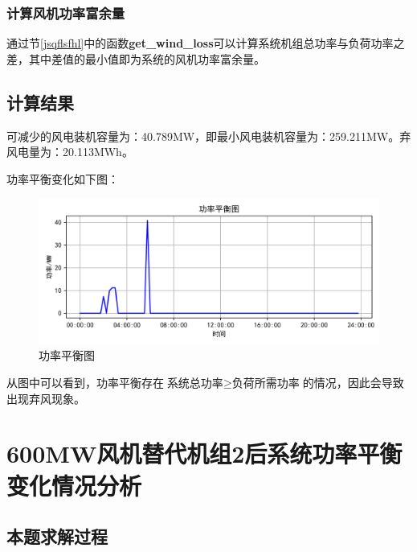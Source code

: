 \documentclass{cumcmthesis}
\begin{document}
	
	
	\subsubsection{计算风机功率富余量}
	通过节\ref{jsqflsfhl}中的函数\textbf{get\_wind\_loss}可以计算系统机组总功率与负荷功率之差，其中差值的最小值即为系统的风机功率富余量。
	
	
	\subsection{计算结果}
	可减少的风电装机容量为：40.789MW，即最小风电装机容量为：259.211MW。弃风电量为：20.113MWh。
	
	功率平衡变化如下图：
	\begin{figure}[H]
		\centering
		\includegraphics[width=1\linewidth]{figures/第二题：功率平衡图}
		\caption{功率平衡图}
		\label{fig:}
	\end{figure}
	
	从图中可以看到，功率平衡存在$ \texttt{系统总功率}\geq \texttt{负荷所需功率}$的情况，因此会导致出现弃风现象。
	
	 \newpage
\section{600MW风机替代机组2后系统功率平衡变化情况分析}
\subsection{本题求解过程}
\end{document}
